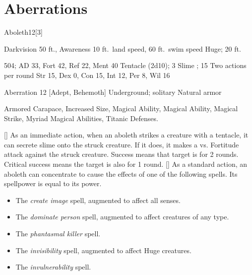 \section{Aberrations}

    \begin{monsection}{Aboleth}{12}[3]
        \begin{spellcontent}
            \begin{spelltargetinginfo}
                \pari {} Darkvision 50 ft., Awareness 
                \pari {} 10 ft.\ land speed, 60 ft.\ swim speed
                \pari {} Huge;  20 ft.
            \end{spelltargetinginfo}
            \begin{spelleffects}
                \pari {} 504;  AD 33, Fort 42, Ref 22, Ment 40
                \pari {} Tentacle  (2d10);  3
                \pari {} Slime ;  15
                \pari {} Two actions per round
                \pari {} Str 15, Dex 0, Con 15, Int 12, Per 8, Wil 16
            \end{spelleffects}
        \end{spellcontent}
        \begin{spellfooter}
            \pari {} Aberration 12 [Adept, Behemoth]
            \pari {} Underground; solitary
            \pari {} Natural armor 
        \end{spellfooter}
    \end{monsection}
     Armored Carapace, Increased Size, Magical Ability, Magical Ability, Magical Strike, Myriad Magical Abilities, Titanic Defenses.

    [] As an immediate action, when an aboleth strikes a creature with a tentacle, it can secrete slime onto the struck creature.
    If it does, it makes a  vs. Fortitude attack against the struck creature.
    Success means that target is \sickened for 2 rounds.
    Critical success means the target is also \nauseated for 1 round.
    [] As a standard action, an aboleth can concentrate to cause the effects of one of the following spells.
    Its spellpower is equal to its power.
    \begin{itemize}
        \item The \textit{create image} spell, augmented to affect all senses.
        \item The \textit{dominate person} spell, augmented to affect creatures of any type.
        \item The \textit{phantasmal killer} spell.
        \item The \textit{invisibility} spell, augmented to affect Huge creatures.
        \item The \textit{invulnerability} spell.
    \end{itemize}
